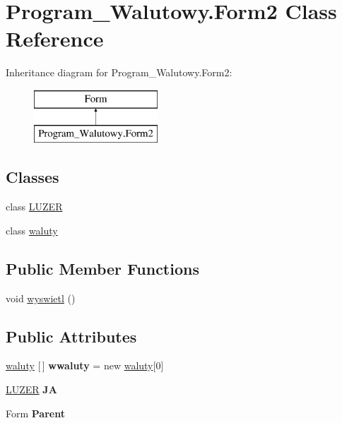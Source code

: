 \hypertarget{class_program___walutowy_1_1_form2}{}\section{Program\+\_\+\+Walutowy.\+Form2 Class Reference}
\label{class_program___walutowy_1_1_form2}
Inheritance diagram for Program\+\_\+\+Walutowy.\+Form2\+:\begin{figure}[H]
\begin{center}
\leavevmode
\includegraphics[height=2.000000cm]{class_program___walutowy_1_1_form2}
\end{center}
\end{figure}
\subsection*{Classes}
\begin{DoxyCompactItemize}
\item 
class \mbox{\hyperlink{class_program___walutowy_1_1_form2_1_1_l_u_z_e_r}{L\+U\+Z\+ER}}
\item 
class \mbox{\hyperlink{class_program___walutowy_1_1_form2_1_1waluty}{waluty}}
\end{DoxyCompactItemize}
\subsection*{Public Member Functions}
\begin{DoxyCompactItemize}
\item 
void \mbox{\hyperlink{class_program___walutowy_1_1_form2_a1c6069b5128d5cc8b2c26180bfee99e3}{wyswietl}} ()
\end{DoxyCompactItemize}
\subsection*{Public Attributes}
\begin{DoxyCompactItemize}
\item 
\mbox{\label{class_program___walutowy_1_1_form2_ae875491b44c5f54b3d4c8805f5040fdf}} 
\mbox{\hyperlink{class_program___walutowy_1_1_form2_1_1waluty}{waluty}} \mbox{[}$\,$\mbox{]} {\bfseries wwaluty} = new \mbox{\hyperlink{class_program___walutowy_1_1_form2_1_1waluty}{waluty}}\mbox{[}0\mbox{]}
\item 
\mbox{\label{class_program___walutowy_1_1_form2_a5424cc6cc1b50a91d66bdd652dfe89c0}} 
\mbox{\hyperlink{class_program___walutowy_1_1_form2_1_1_l_u_z_e_r}{L\+U\+Z\+ER}} {\bfseries JA}
\item 
\mbox{\label{class_program___walutowy_1_1_form2_a37f0faaffb4b4fd72d5995f4d53032d5}} 
Form {\bfseries Parent}
\end{DoxyCompactItemize}
